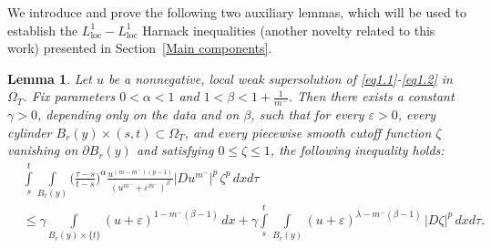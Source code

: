 \documentclass[a4paper,11pt,fullpage]{article}
\numberwithin{equation}{section}
\newtheorem{lemma}{Lemma}[section]
\begin{document}
\noindent We introduce and prove the following two auxiliary lemmas, which will be used to establish the $L^{1}_{\mathrm{loc}}-L^{1}_{\mathrm{loc}}$ Harnack inequalities (another novelty related to this work) presented in Section~\ref{Main components}.

\begin{lemma}\label{lem2.3}
Let $u$ be a nonnegative, local weak supersolution of \eqref{eq1.1}-\eqref{eq1.2} in $\Omega_T$. Fix parameters $0<\alpha<1$ and $1<\beta<1+\frac{1}{m^{-}}$. Then there exists a constant $\gamma>0$, depending only on the data and on $\beta$, such that for every $\varepsilon>0$, every cylinder $B_r(y)\times(s,t)\subset\Omega_T$, and every piecewise smooth cutoff function $\zeta$ vanishing on $\partial B_r(y)$ and satisfying $0\leqslant\zeta\leqslant 1$, the following inequality holds:
\begin{equation}\label{eq2.2}
\begin{aligned}
&\int\limits_s^t\int\limits_{B_r(y)}\Big(\frac{\tau-s}{t-s}\Big)^\alpha
\frac{u^{(m-m^-)(p-1)}}{(u^{m^-}+\varepsilon^{m^-})^\beta}|D u^{m^-}|^{p}\,\zeta^{p}\,dx d\tau
\\&\leqslant \gamma \int\limits_{B_r(y)\times\{t\}}(u+\varepsilon)^{1-m^-(\beta-1)}\,dx+
\gamma \int\limits_s^t\int\limits_{B_r(y)}(u+\varepsilon)^{\lambda-m^-(\beta-1)}\,|D \zeta|^{p}\,dx d\tau.
\end{aligned}
\end{equation}
\end{lemma}
\end{document}
